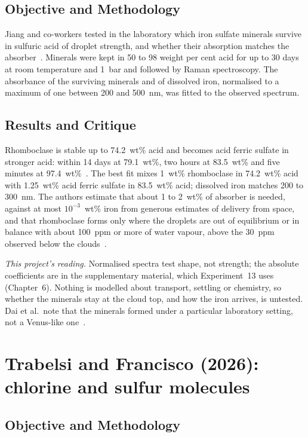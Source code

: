 \subsection{Objective and Methodology}

Jiang and co-workers tested in the laboratory which iron sulfate minerals survive in
sulfuric acid of droplet strength, and whether their absorption matches the
absorber~\cite{jiang2024}. Minerals were kept in 50 to 98 weight per cent acid for up to
30 days at room temperature and 1~bar and followed by Raman spectroscopy. The absorbance
of the surviving minerals and of dissolved iron, normalised to a maximum of one between
200 and 500~nm, was fitted to the observed spectrum.

\subsection{Results and Critique}

Rhomboclase is stable up to 74.2~wt\% acid and becomes acid ferric sulfate in stronger
acid: within 14 days at 79.1~wt\%, two hours at 83.5~wt\% and five minutes at
97.4~wt\%~\cite{jiang2024}. The best fit mixes 1~wt\% rhomboclase in 74.2~wt\% acid with
1.25~wt\% acid ferric sulfate in 83.5~wt\% acid; dissolved iron matches 200 to 300~nm.
The authors estimate that about 1 to 2~wt\% of absorber is needed, against at most
$10^{-3}$~wt\% iron from
generous estimates of delivery from space, and that rhomboclase forms only where the
droplets are out of equilibrium or in balance with about 100~ppm or more of water vapour,
above the 30~ppm observed below the clouds~\cite{jiang2024}.

\emph{This project's reading.} Normalised spectra test shape, not strength; the absolute
coefficients are in the supplementary material, which Experiment~13 uses (Chapter~6).
Nothing is modelled about transport, settling or chemistry, so whether the minerals stay
at the cloud top, and how the iron arrives, is untested. Dai et al.\ note that the
minerals formed under a particular laboratory setting, not a Venus-like
one~\cite{dai2024}.

\section{Trabelsi and Francisco (2026): chlorine and sulfur molecules}
\label{sec:lit-trabelsi}

\subsection{Objective and Methodology}

